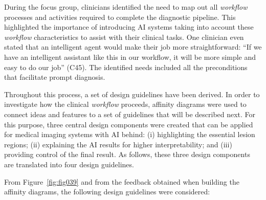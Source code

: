 During the focus group, clinicians identified the need to map out all {\it workflow} processes and activities required to complete the diagnostic pipeline.
This highlighted the importance of introducing \ac{AI} systems taking into account these {\it workflow} characteristics to assist with their clinical tasks.
One clinician even stated that an intelligent agent would make their job more straightforward:
``If we have an intelligent assistant like this in our workflow, it will be more simple and easy to do our job'' (C45).
The identified needs included all the preconditions that facilitate prompt diagnosis.

Throughout this process, a set of design guidelines have been derived.
In order to investigate how the clinical {\it workflow} proceeds, affinity diagrams were used to connect ideas and features to a set of guidelines that will be described next.
For this purpose, three central design components were created that can be applied for medical imaging systems with \ac{AI} behind:
(i) highlighting the essential lesion regions;
(ii) explaining the \ac{AI} results for higher interpretability; and
(iii) providing control of the final result.
As follows, these three design components are translated into four design guidelines.

\noindent
From Figure~\ref{fig:fig039} and from the feedback obtained when building the affinity diagrams, the following design guidelines were considered:

\vspace{1.00mm}


